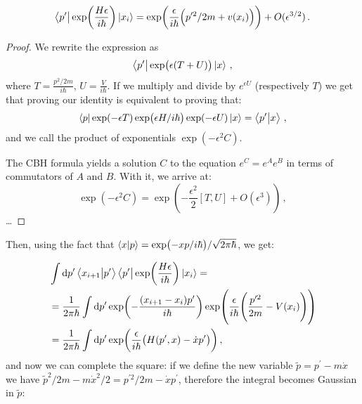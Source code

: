 \documentclass[main.tex]{subfiles}
\begin{document}
\begin{claim}
\begin{equation}
  \bra{p'} 
  \exp(\frac{H \epsilon }{i \hbar}) \ket{x_i}
  = \exp(\frac{\epsilon }{i \hbar} \qty(p^{\prime 2}/2m + v(x_{i}))) + O(\epsilon^{3/2})
\,.
\end{equation}
\end{claim}

\begin{proof}
  We rewrite the expression as 
  \begin{equation}
    \bra{p^{\prime }} \exp(\epsilon (T+U)) \ket{x}  
  \,,
  \end{equation}
  where \(T = \frac{p^2/2m}{ i \hbar} \), \(U = \frac{V}{i \hbar}\).
  If we multiply and divide by \(e^{\epsilon U}\) (respectively \(T\)) we get that proving our identity is equivalent to proving that: 
  \begin{equation}
    \bra{p} \exp(-\epsilon T) \exp(\epsilon H / i \hbar) \exp(-\epsilon U) \ket{x}  = \braket{p'}{x} 
  \,,
  \end{equation}
  and we call the product of exponentials \(\exp(-\epsilon^2 C) \).

  The CBH formula yields a solution \(C\) to the equation \(e^{C}= e^{A}e^{B}\) in terms of commutators of \(A\) and \(B\).
  With it, we arrive at:  
  \begin{equation}
    \exp(-\epsilon^2 C) = \exp(- \frac{\epsilon^2}{2} [T, U] + O(\epsilon^3)) 
  \,,
  \end{equation}
  \dots
\end{proof}

Then, using the fact that \(\braket{x}{p} = \exp(-xp/i\hbar) / \sqrt{2 \pi \hbar} \), we get: 


%
\begin{subequations}
\begin{align}
  &\int  \dd{p'} \braket{x_{i+1}}{p'} \bra{p'} 
  \exp(\frac{H \epsilon }{i \hbar}) \ket{x_i} =  \\
  &= \frac{1}{2 \pi \hbar} \int  \dd{p^{\prime }} 
  \exp(-\frac{\qty(x_{i+1}-x_{i})p^{\prime }}{i \hbar}) 
  \exp(\frac{\epsilon }{i \hbar}\qty(\frac{p^{\prime 2}}{2m} - V(x_{i})))  \\
  &= \frac{1}{2 \pi \hbar}
  \int  \dd{p^{\prime }} \exp(\frac{\epsilon}{i \hbar} \qty(H(p^{\prime}, x ) - \dot{x} p^{\prime }))
  \,,
\end{align}
\end{subequations}
%
and now we can complete the square: if we define the new variable \(\widetilde{p} = p^{\prime } - m \dot{x}\) we have \(\widetilde{p}^2/2m - m \dot{x}^2 /2 = p^{\prime 2} /2m - \dot{x} p^{\prime }\), therefore the integral becomes Gaussian in \(\widetilde{p}\): 
%
\end{document}
